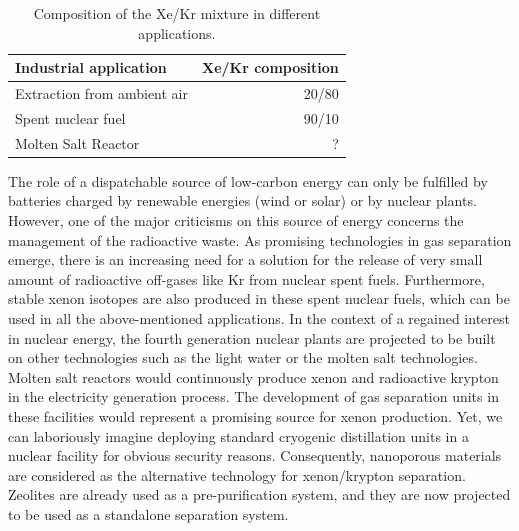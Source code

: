 \documentclass[main.tex]{subfiles}
\begin{document}
\setlength{\extrarowheight}{0.1cm}
\begin{table}[ht]
\begin{tabular}{|l|r|}
\hline
 Industrial application  &  Xe/Kr composition  \\
\hline
 Extraction from ambient air\cite{kerry2007industrial} &  20/80  \\[0.5mm]
 Spent nuclear fuel\cite{auerbach2003handbook} &  90/10  \\[0.5mm]
 Molten Salt Reactor\cite{Riley_2019} &  ? \\[0.5mm]
\hline
\end{tabular}
\caption{Composition of the Xe/Kr mixture in different applications.}
\label{tab:indus_app}
\end{table}

The role of a dispatchable source of low-carbon energy can only be fulfilled by batteries charged by renewable energies (wind or solar) or by nuclear plants. However, one of the major criticisms on this source of energy concerns the management of the radioactive waste. As promising technologies in gas separation emerge, there is an increasing need for a solution for the release of very small amount of radioactive off-gases like Kr from nuclear spent fuels.\cite{Blomeke_1969} Furthermore, stable xenon isotopes are also produced in these spent nuclear fuels, which can be used in all the above-mentioned applications. In the context of a regained interest in nuclear energy, the fourth generation nuclear plants are projected to be built on other technologies such as the light water or the molten salt technologies.\cite{LeBlanc_2010} Molten salt reactors would continuously produce xenon and radioactive krypton in the electricity generation process.\cite{Riley_2019} The development of gas separation units in these facilities would represent a promising source for xenon production. Yet, we can laboriously imagine deploying standard cryogenic distillation units in a nuclear facility for obvious security reasons. Consequently, nanoporous materials are considered as the alternative technology for xenon/krypton separation. Zeolites are already used as a pre-purification system,\cite{kerry2007industrial} and they are now projected to be used as a standalone separation system. 
\end{document}
